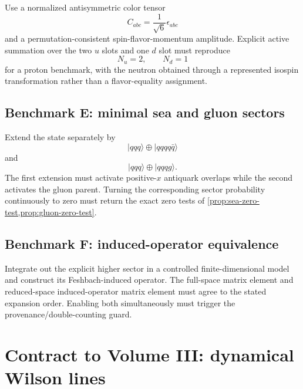 \documentclass[11pt]{article}
\begin{document}
Use a normalized antisymmetric color tensor
\begin{equation}
 C_{abc}=\frac{1}{\sqrt6}\epsilon_{abc}
\label{eq:three-quark-color}
\end{equation}
and a permutation-consistent spin-flavor-momentum amplitude.  Explicit active
summation over the two \(u\) slots and one \(d\) slot must reproduce
\begin{equation}
 N_u=2,
 \qquad
 N_d=1
\label{eq:proton-valence-count}
\end{equation}
for a proton benchmark, with the neutron obtained through a represented
isospin transformation rather than a flavor-equality assignment.

\subsection{Benchmark E: minimal sea and gluon sectors}

Extend the state separately by
\begin{equation}
 |qqq\rangle\oplus|qqqq\bar q\rangle
\label{eq:minimal-sea-benchmark}
\end{equation}
and
\begin{equation}
 |qqq\rangle\oplus|qqqg\rangle.
\label{eq:minimal-gluon-benchmark}
\end{equation}
The first extension must activate positive-\(x\) antiquark overlaps while the
second activates the gluon parent.  Turning the corresponding sector
probability continuously to zero must return the exact zero tests of
\cref{prop:sea-zero-test,prop:gluon-zero-test}.

\subsection{Benchmark F: induced-operator equivalence}

Integrate out the explicit higher sector in a controlled finite-dimensional
model and construct its Feshbach-induced operator.  The full-space matrix
element and reduced-space induced-operator matrix element must agree to the
stated expansion order.  Enabling both simultaneously must trigger the
provenance/double-counting guard.

\section{Contract to Volume III: dynamical Wilson lines}
\label{sec:volume-iii-contract}
\end{document}
